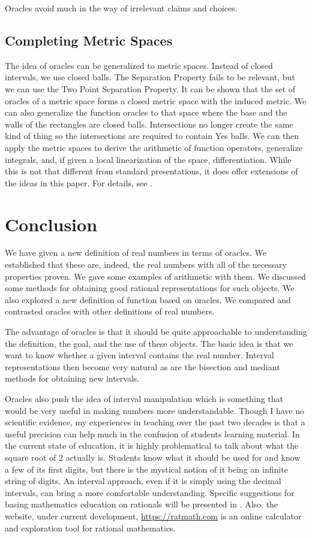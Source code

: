 \documentclass[12pt]{article}
\theoremstyle{remark}
\begin{document}
Oracles avoid much in the way of irrelevant claims and choices.

\subsection{Completing Metric Spaces}

The idea of oracles can be generalized to metric spaces. Instead of closed intervals, we use closed balls. The Separation Property fails to be relevant, but we can use the Two Point Separation Property. It can be shown that the set of oracles of a metric space forms a closed metric space with the induced metric.  We can also generalize the function oracles to that space where the base and the walls of the rectangles are closed balls. Intersections no longer create the same kind of thing so the intersections are required to contain Yes balls. We can then apply the metric spaces to derive the arithmetic of function operators, generalize integrals, and, if given a local linearization of the space, differentiation. While this is not that different from standard presentations, it does offer extensions of the ideas in this paper. For details, see \cite{taylor23metric}. 

\section{Conclusion}

We have given a new definition of real numbers in terms of oracles. We established that these are, indeed, the real numbers with all of the necessary properties proven. We gave some examples of arithmetic with them. We discussed some methods for obtaining good rational representations for such objects. We also explored a new definition of function based on oracles. We compared and contrasted oracles with other definitions of real numbers. 

The advantage of oracles is that it should be quite approachable to understanding the definition, the goal, and the use of these objects. The basic idea is that we want to know whether a given interval contains the real number. Interval representations then become very natural as are the bisection and mediant methods for obtaining new intervals. 

Oracles also push the idea of interval manipulation which is something that would be very useful in making numbers more understandable. Though I have no scientific evidence, my experiences in teaching over the past two decades is that a useful precision can help much in the confusion of students learning material. In the current state of education, it is highly problematical to talk about what the square root of 2 actually is. Students know what it should be used for and know a few of its first digits, but there is the mystical notion of it being an infinite string of digits. An interval approach, even if it is simply using the decimal intervals, can bring a more comfortable understanding. Specific suggestions for basing mathematics education on rationals will be presented in \cite{taylor23edu}. Also, the website, under current development, \url{https://ratmath.com} is an online calculator and exploration tool for rational mathematics. 
\end{document}
